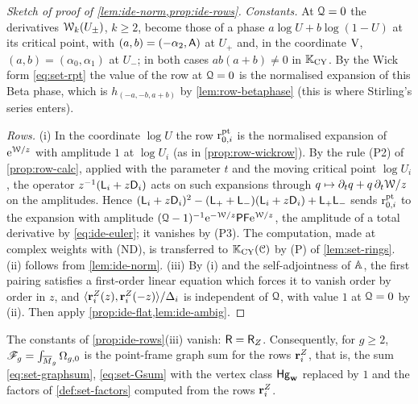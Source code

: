 \begin{proof}[Sketch of proof of \cref{lem:ide-norm,prop:ide-rows}]
\emph{Constants.} At $\mathcal{Q}=0$ the derivatives $\mathcal{W}_k(U_\pm)$, $k\geq2$, become those of a phase $a\log U+b\log(1-U)$ at its critical point, with $(a,b)=(-\alpha_2,\mathsf{A})$ at $U_+$ and, in the coordinate $\mathrm{V}$, $(a,b)=(\alpha_0,\alpha_1)$ at $U_-$; in both cases $ab(a+b)\neq0$ in $\mathbb{K}_{\mathrm{CY}}$. By the Wick form \eqref{eq:set-rpt} the value of the row at $\mathcal{Q}=0$ is the normalised expansion of this Beta phase, which is $h_{(-a,-b,a+b)}$ by \cref{lem:row-betaphase} (this is where Stirling's series enters).

\emph{Rows.} (i) In the coordinate $\log U$ the row $\mathrm{r}^{\mathrm{pt}}_{0,i}$ is the normalised expansion of $\mathrm{e}^{\mathcal{W}/z}$ with amplitude $1$ at $\log U_i$ (as in \cref{prop:row-wickrow}). By the rule (P2) of \cref{prop:row-calc}, applied with the parameter $t$ and the moving critical point $\log U_i$, the operator $z^{-1}(\mathsf{L}_i+z\mathsf{D}_i)$ acts on such expansions through $q\mapsto\partial_tq+q\,\partial_t\mathcal{W}/z$ on the amplitudes. Hence $(\mathsf{L}_i+z\mathsf{D}_i)^2-(\mathsf{L}_++\mathsf{L}_-)(\mathsf{L}_i+z\mathsf{D}_i)+\mathsf{L}_+\mathsf{L}_-$ sends $\mathrm{r}^{\mathrm{pt}}_{0,i}$ to the expansion with amplitude $(\mathcal{Q}-1)^{-1}\mathrm{e}^{-\mathcal{W}/z}\mathsf{PF}\mathrm{e}^{\mathcal{W}/z}$, the amplitude of a total derivative by \eqref{eq:ide-euler}; it vanishes by (P3). The computation, made at complex weights with (ND), is transferred to $\mathbb{K}_{\mathrm{CY}}(\mathcal{C})$ by (P) of \cref{lem:set-rings}. (ii) follows from \cref{lem:ide-norm}. (iii) By (i) and the self-adjointness of $\mathbb{A}$, the first pairing satisfies a first-order linear equation which forces it to vanish order by order in $z$, and $\langle\mathbf{r}^Z_i(z),\mathbf{r}^Z_i(-z)\rangle/\Delta_i$ is independent of $\mathcal{Q}$, with value $1$ at $\mathcal{Q}=0$ by (ii). Then apply \cref{prop:ide-flat,lem:ide-ambig}.
\end{proof}

\begin{prop}[{\Lref{Proposition~5.14}: $\Rm=\RZ$}]
\label{prop:ide-const}
The constants of \cref{prop:ide-rows}(iii) vanish: $\Rm=\RZ$. Consequently, for $g\geq2$, $\mathscr{F}_g=\int_{\overline{M}_g}\Omega_{g,0}$ is the point-frame graph sum for the rows $\mathbf{r}^Z_i$, that is, the sum \eqref{eq:set-graphsum}, \eqref{eq:set-Gsum} with the vertex class $\mathsf{Hg}_{\mathbf{w}}$ replaced by $1$ and the factors of \cref{def:set-factors} computed from the rows $\mathbf{r}^Z_i$.
\end{prop}

